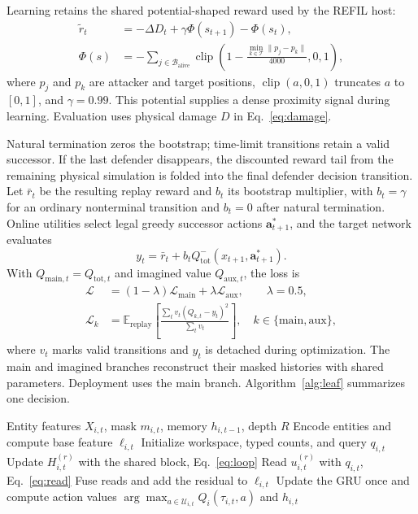 Learning retains the shared potential-shaped reward used by the REFIL host:
\begin{align}
 \widetilde r_t&=-\Delta D_t+\gamma\Phi(s_{t+1})-\Phi(s_t),\nonumber\\
 \Phi(s)&=-\sum_{j\in\mathcal B_{\mathrm{alive}}}
 \operatorname{clip}\!\left(1-\frac{\min_{k\in\mathcal T}\|p_j-p_k\|}{4000},0,1\right),
 \label{eq:shaping}
\end{align}
where $p_j$ and $p_k$ are attacker and target positions, $\operatorname{clip}(a,0,1)$ truncates $a$ to $[0,1]$, and $\gamma=0.99$. This potential supplies a dense proximity signal during learning. Evaluation uses physical damage $D$ in Eq.~\eqref{eq:damage}.

Natural termination zeros the bootstrap; time-limit transitions retain a valid successor. If the last defender disappears, the discounted reward tail from the remaining physical simulation is folded into the final defender decision transition. Let $\bar r_t$ be the resulting replay reward and $b_t$ its bootstrap multiplier, with $b_t=\gamma$ for an ordinary nonterminal transition and $b_t=0$ after natural termination. Online utilities select legal greedy successor actions $\boldsymbol a^*_{t+1}$, and the target network evaluates
\begin{equation}
 y_t=\bar r_t+b_t
 Q^-_{\mathrm{tot}}(x_{t+1},\boldsymbol a^*_{t+1}).
 \label{eq:td-target}
\end{equation}
With $Q_{\mathrm{main},t}=Q_{\mathrm{tot},t}$ and imagined value $Q_{\mathrm{aux},t}$, the loss is
\begin{align}
 \mathcal L&=(1-\lambda)\mathcal L_{\mathrm{main}}
                  +\lambda\mathcal L_{\mathrm{aux}},\qquad\lambda=0.5,\nonumber\\
 \mathcal L_k&=\mathbb E_{\mathrm{replay}}\!
 \left[\frac{\sum_t v_t(Q_{k,t}-y_t)^2}{\sum_t v_t}\right],
 \quad k\in\{\mathrm{main},\mathrm{aux}\},
 \label{eq:td-loss}
\end{align}
where $v_t$ marks valid transitions and $y_t$ is detached during optimization. The main and imagined branches reconstruct their masked histories with shared parameters. Deployment uses the main branch. Algorithm~\ref{alg:leaf} summarizes one decision.

\begin{algorithm}[!t]
\caption{LEAF at one defender decision}
\label{alg:leaf}
\begin{algorithmic}[1]
\Require Entity features $X_{i,t}$, mask $m_{i,t}$, memory $h_{i,t-1}$, depth $R$
\State Encode entities and compute base feature $\ell_{i,t}$
\State Initialize workspace, typed counts, and query $q_{i,t}$
\State Update $H_{i,t}^{(r)}$ with the shared block, Eq.~\eqref{eq:loop}
\State Read $u_{i,t}^{(r)}$ with $q_{i,t}$, Eq.~\eqref{eq:read}
\EndFor
\State Fuse reads and add the residual to $\ell_{i,t}$
\State Update the GRU once and compute action values
\State \Return $\arg\max_{a\in\mathcal U_{i,t}}Q_i(\tau_{i,t},a)$ and $h_{i,t}$
\end{algorithmic}
\end{algorithm}

